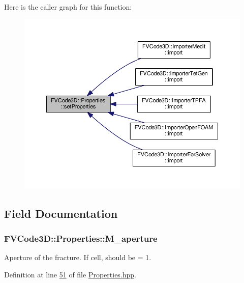 Here is the caller graph for this function\+:
\nopagebreak
\begin{figure}[H]
\begin{center}
\leavevmode
\includegraphics[width=350pt]{classFVCode3D_1_1Properties_a0ddb477254cfacdb96a440ddedc2548c_icgraph}
\end{center}
\end{figure}




\subsection{Field Documentation}
\subsubsection[{\texorpdfstring{M\+\_\+aperture}{M_aperture}}]{ F\+V\+Code3\+D\+::\+Properties\+::\+M\+\_\+aperture}\hypertarget{classFVCode3D_1_1Properties_ace95facc126d88b414622cdb0e4fc835}{}\label{classFVCode3D_1_1Properties_ace95facc126d88b414622cdb0e4fc835}


Aperture of the fracture. If cell, should be = 1. 



Definition at line \hyperlink{Properties_8hpp_source_l00051}{51} of file \hyperlink{Properties_8hpp_source}{Properties.\+hpp}.

